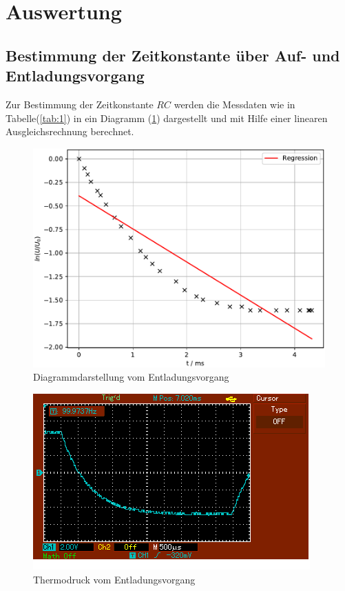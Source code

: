
\section{Auswertung}
\subsection{Bestimmung der Zeitkonstante über Auf- und Entladungsvorgang}
Zur Bestimmung der Zeitkonstante $RC$ werden die Messdaten wie in Tabelle(\ref{tab:1})
in ein Diagramm (\ref{fig:6}) dargestellt und mit Hilfe einer linearen Ausgleichsrechnung
berechnet.

\begin{figure}[H]
  \centering
  \includegraphics[width=\textwidth]{Diagramm1.pdf}
  \caption{Diagrammdarstellung vom Entladungsvorgang}
  \label{fig:6}
\end{figure}
\begin{figure}[H]
  \centering
  \includegraphics[width=\textwidth]{Entlade.jpg}
  \caption{Thermodruck vom Entladungsvorgang}
\end{figure}

